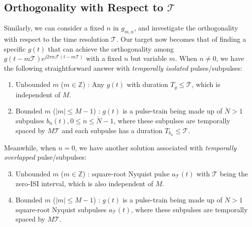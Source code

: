 \documentclass[journal]{IEEEtran}
\begin{document}
\subsection{Orthogonality with Respect to $\mathcal T$}
Similarly, we can consider a fixed $n$ in $g_{m,n}$, and investigate the orthogonality with respect to the time resolution $\mathcal T$.
Our target now becomes that of  finding a specific $g(t)$ that can achieve the orthogonality among $g(t-m\mathcal T)e^{j2\pi n \mathcal F (t-m\mathcal T)}$ with a fixed $n$ but variable $m$. When $n\ne 0$, we have the following straightforward answer with  \emph{temporally isolated} pulses/subpulses:
\renewcommand{\labelenumi}{T\arabic{enumi})}
\begin{enumerate}
  \item Unbounded $m$ ($m\in \mathbb Z$) : Any $g(t)$ with duration $T_g\le \mathcal T$, which is independent of $M$.
  \item Bounded $m$ ($|m|\le M-1$) : $g(t)$ is a pulse-train being made up of $\dot N >1 $ subpulses $b_{\dot n}(t), 0\le \dot n \le \dot N-1$, where these subpulses are temporally spaced by $M\mathcal T$ and each subpulse has a duration $T_{b_{\dot n}} \le \mathcal T$.
\end{enumerate}
Meanwhile, when $n=0$, we have another solution associated with \emph{temporally overlapped} pulse/subpulses:
\begin{enumerate}
  \setcounter{enumi}{2}
  \item Unbounded $m$ ($m\in \mathbb Z$) : square-root Nyquist pulse $a_{\mathcal T}(t)$ {with $\mathcal T$ being the zero-ISI interval}, which is also independent of $M$.
  \item Bounded $m$ ($|m|\le M-1$) : $g(t)$ is a pulse-train being made up of $\dot N >1 $ {square-root Nyquist subpulses $a_{\mathcal T}(t)$, where these subpulses} are temporally spaced by $M\mathcal T$.
\end{enumerate}
\end{document}

